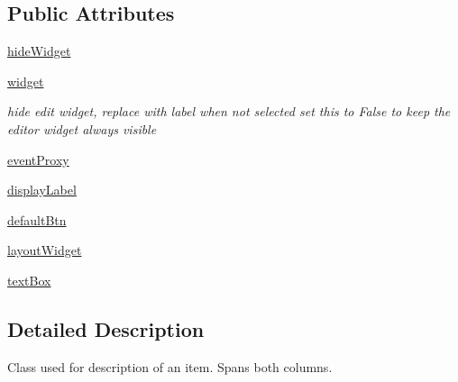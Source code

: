 \subsection*{Public Attributes}
\begin{DoxyCompactItemize}
\item 
\hyperlink{classsoftware_1_1chipwhisperer_1_1common_1_1ui_1_1ParameterTypesCustom_1_1LabelParameterItem_a2cad9724b1f2f3ebc5036d4d3baa4614}{hide\+Widget}
\item 
\hyperlink{classsoftware_1_1chipwhisperer_1_1common_1_1ui_1_1ParameterTypesCustom_1_1LabelParameterItem_a314c57ec0ea8261cf90b1766d1e25bdb}{widget}
\begin{DoxyCompactList}\small\item\em hide edit widget, replace with label when not selected set this to False to keep the editor widget always visible \end{DoxyCompactList}\item 
\hyperlink{classsoftware_1_1chipwhisperer_1_1common_1_1ui_1_1ParameterTypesCustom_1_1LabelParameterItem_a55512dd92c44ec374ff0623494e52088}{event\+Proxy}
\item 
\hyperlink{classsoftware_1_1chipwhisperer_1_1common_1_1ui_1_1ParameterTypesCustom_1_1LabelParameterItem_a5dac4e8625c835355700497e2b9d36e2}{display\+Label}
\item 
\hyperlink{classsoftware_1_1chipwhisperer_1_1common_1_1ui_1_1ParameterTypesCustom_1_1LabelParameterItem_a17977f3b50ffd3df2da84417e85ddd40}{default\+Btn}
\item 
\hyperlink{classsoftware_1_1chipwhisperer_1_1common_1_1ui_1_1ParameterTypesCustom_1_1LabelParameterItem_aa00eb1692f60efe274bc128e30de8819}{layout\+Widget}
\item 
\hyperlink{classsoftware_1_1chipwhisperer_1_1common_1_1ui_1_1ParameterTypesCustom_1_1LabelParameterItem_ade9d43b95fa43ec2de96142b718d5505}{text\+Box}
\end{DoxyCompactItemize}


\subsection{Detailed Description}
\begin{DoxyVerb}Class used for description of an item. Spans both columns. \end{DoxyVerb}
 

